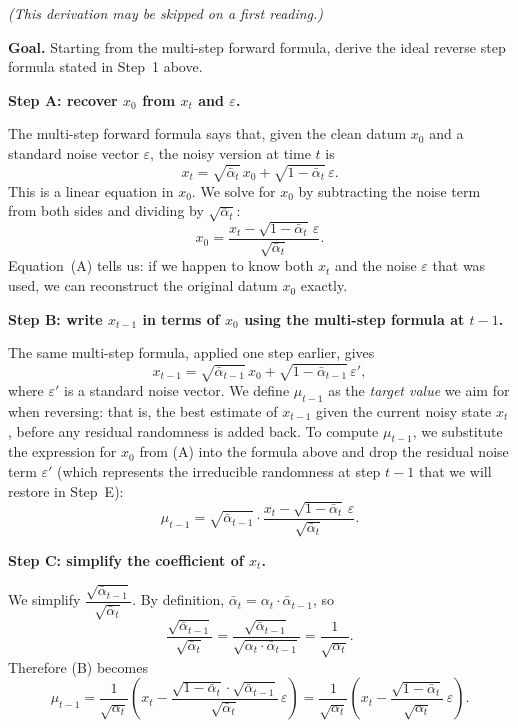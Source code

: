 \documentclass[11pt]{article}
\begin{document}
\begin{mdframed}[linewidth=1pt, frametitle={\textbf{Proof (for the curious reader): derivation of the reverse step}}]
\textit{(This derivation may be skipped on a first reading.)}

\medskip\noindent
\textbf{Goal.} Starting from the multi-step forward formula, derive the ideal reverse step formula stated in Step~1 above.

\medskip\noindent
\textbf{Step A: recover $x_0$ from $x_t$ and $\varepsilon$.}

The multi-step forward formula says that, given the clean datum $x_0$ and a standard noise vector $\varepsilon$, the noisy version at time $t$ is
\[
x_t = \sqrt{\bar\alpha_t}\,x_0 + \sqrt{1-\bar\alpha_t}\,\varepsilon.
\]
This is a linear equation in $x_0$.
We solve for $x_0$ by subtracting the noise term from both sides and dividing by $\sqrt{\bar\alpha_t}$:
\[
x_0 = \frac{x_t - \sqrt{1-\bar\alpha_t}\,\varepsilon}{\sqrt{\bar\alpha_t}}.
\tag{A}
\]
Equation~(A) tells us: if we happen to know both $x_t$ and the noise $\varepsilon$ that was used, we can reconstruct the original datum $x_0$ exactly.

\medskip\noindent
\textbf{Step B: write $x_{t-1}$ in terms of $x_0$ using the multi-step formula at $t-1$.}

The same multi-step formula, applied one step earlier, gives
\[
x_{t-1} = \sqrt{\bar\alpha_{t-1}}\,x_0 + \sqrt{1-\bar\alpha_{t-1}}\,\varepsilon',
\]
where $\varepsilon'$ is a standard noise vector.
We define $\mu_{t-1}$ as the \emph{target value} we aim for when reversing: that is, the best estimate of $x_{t-1}$ given the current noisy state $x_t$, before any residual randomness is added back.
To compute $\mu_{t-1}$, we substitute the expression for $x_0$ from (A) into the formula above and drop the residual noise term $\varepsilon'$ (which represents the irreducible randomness at step $t-1$ that we will restore in Step~E):
\[
\mu_{t-1}
= \sqrt{\bar\alpha_{t-1}} \cdot \frac{x_t - \sqrt{1-\bar\alpha_t}\,\varepsilon}{\sqrt{\bar\alpha_t}}.
\tag{B}
\]

\medskip\noindent
\textbf{Step C: simplify the coefficient of $x_t$.}

We simplify $\dfrac{\sqrt{\bar\alpha_{t-1}}}{\sqrt{\bar\alpha_t}}$.
By definition, $\bar\alpha_t = \alpha_t \cdot \bar\alpha_{t-1}$, so
\[
\frac{\sqrt{\bar\alpha_{t-1}}}{\sqrt{\bar\alpha_t}}
= \frac{\sqrt{\bar\alpha_{t-1}}}{\sqrt{\alpha_t \cdot \bar\alpha_{t-1}}}
= \frac{1}{\sqrt{\alpha_t}}.
\]
Therefore (B) becomes
\[
\mu_{t-1}
= \frac{1}{\sqrt{\alpha_t}}\!\left(x_t - \frac{\sqrt{1-\bar\alpha_t}\cdot\sqrt{\bar\alpha_{t-1}}}{\sqrt{\bar\alpha_t}}\,\varepsilon\right)
= \frac{1}{\sqrt{\alpha_t}}\!\left(x_t - \frac{\sqrt{1-\bar\alpha_t}}{\sqrt{\alpha_t}}\,\varepsilon\right).
\tag{C}
\]


\end{mdframed}
\end{document}
